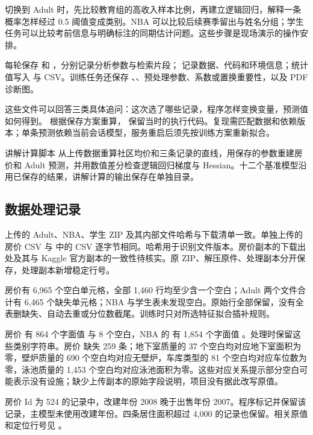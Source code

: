 切换到 Adult 时，先比较教育组的高收入样本比例，再建立逻辑回归，解释一条概率怎样经过 0.5 阈值变成类别。NBA 可以比较后续赛季留出与姓名分组；学生任务可以比较考前信息与明确标注的同期估计问题。这些步骤是现场演示的操作安排。

每轮保存  和 ，分别记录分析参数与检索片段； 记录数据、代码和环境信息；统计值写入  与 CSV。训练任务还保存 、、预处理参数、系数或置换重要性，以及 PDF 诊断图。

这些文件可以回答三类具体追问：这次选了哪些记录，程序怎样变换变量，预测值如何得到。 根据保存方案重算， 保留当时的执行代码。复现需匹配数据和依赖版本；单条预测依赖当前会话模型，服务重启后须先按训练方案重新拟合。

讲解计算脚本  从上传数据重算社区均价和三条记录的直线，用保存的参数重建房价和 Adult 预测，并用数值差分检查逻辑回归梯度与 Hessian。十二个基准模型沿用已保存的结果，讲解计算的输出保存在单独目录。

\subsection{数据处理记录}
上传的 Adult、NBA、学生 ZIP 及其内部文件哈希与下载清单一致。单独上传的房价 CSV 与  中的 CSV 逐字节相同。哈希用于识别文件版本。房价副本的下载出处及其与 Kaggle 官方副本的一致性待核实。原 ZIP、解压原件、处理副本分开保存，处理副本新增稳定行号。

房价有 6,965 个空白单元格，全部 1,460 行均至少含一个空白；Adult 两个文件合计有 6,465 个缺失单元格；NBA 与学生表未发现空白。原始行全部保留，没有全表删缺失、自动去重或分位数截尾。训练时只对所选特征拟合插补规则。

房价  有 864 个字面值  与 8 个空白，NBA 的  有 1,854 个字面值 。处理时保留这些类别字符串。房价  缺失 259 条；地下室质量的 37 个空白均对应地下室面积为零，壁炉质量的 690 个空白均对应无壁炉，车库类型的 81 个空白均对应车位数为零，泳池质量的 1,453 个空白均对应泳池面积为零。这些对应关系提示部分空白可能表示没有设施；缺少上传副本的原始字段说明，项目没有据此改写原值。

房价 Id 为 524 的记录中，改建年份 2008 晚于出售年份 2007。程序标记并保留该记录，主模型未使用改建年份。四条居住面积超过 4,000 的记录也保留。相关原值和定位行号见 。

